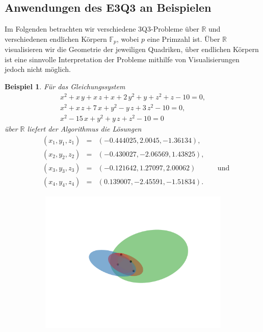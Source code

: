 \documentclass[a4paper,oneside, 11pt, openany%
]{article}
\newcommand{\R}{{\mathbb R}}
\newcommand{\F}[1]{\mathbb{F}_{#1}}
\theoremstyle{custom}
\theoremstyle{custom}
\newtheorem{example}{Beispiel}[section]
\begin{document}
	\subsection{Anwendungen des E3Q3 an Beispielen}\label{sec:3Q3_examples}
	Im Folgenden betrachten wir verschiedene 3Q3-Probleme über $\R$ und verschiedenen endlichen Körpern $\F{p}$, wobei $p$ eine Primzahl ist. Über $\R$ visualisieren wir die Geometrie der jeweiligen Quadriken, über endlichen Körpern ist eine sinnvolle Interpretation der Probleme mithilfe von Visualisierungen jedoch nicht möglich.
	\begin{example}
		\label{ex:3Q3_1}
		Für das Gleichungssystem
		\begin{equation*}\label{eqn:example1}
			    \begin{alignedat}{-1}
			    	x^2+x\,y+x\,z+x+2\,y^2+y+z^2+z-10=0,\\
			    	x^2+x\,z+7\,x+y^2-y\,z+3\,z^2-10=0,\\
			    	x^2-15\,x+y^2+y\,z+z^2-10=0
			    	\end{alignedat}
		    	\end{equation*}
		 über $\R$ liefert der Algorithmus die Lösungen 
		 \begin{equation*}
		 	\begin{alignedat}{5}
		 		&\left( x_{1},y_{1},z_{1}\right) &=& \left(-0.444025,2.0045,-1.36134 \right),&&\\
		 	&\left( x_{2},y_{2},z_{2}\right) &=& \left(-0.430027,-2.06569,1.43825 \right),&&\\
		 	&\left( x_{3},y_{3},z_{3}\right) &=& \left(-0.121642,1.27097,2.00062 \right)&&\ \text{und} \\
		 	&\left( x_{4},y_{4},z_{4}\right) &=& \left(0.139007,-2.45591,-1.51834 \right).&&
		 	\end{alignedat}
		 \end{equation*}
		\end{example}
		 \begin{figure}[H]
		 	\label{img:example1}
		 	\centering
		 	\begin{subfigure}[b]{0.8\textwidth}
		 		\includegraphics[width=\textwidth]{"images/e3q3_example1.png"}
		 	\end{subfigure}
		 \end{figure}
\end{document}
